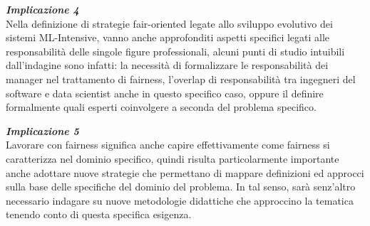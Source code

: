 	\begin{center}
	
        \begin{tcolorbox}[width=\textwidth, colframe=black, colback=Gray]
    			\begin{minipage}{\textwidth}
    				\textit{\faCaretSquareORight  \textbf{ Implicazione 4}}\\
    		   Nella definizione di strategie fair-oriented legate allo sviluppo evolutivo dei sistemi ML-Intensive, vanno anche approfonditi aspetti specifici legati alle responsabilità delle singole figure professionali, alcuni punti di studio intuibili dall'indagine sono infatti: la necessità di formalizzare le responsabilità dei manager nel trattamento di fairness, l'overlap di responsabilità tra ingegneri del software e data scientist anche in questo specifico caso, oppure il definire formalmente quali esperti coinvolgere a seconda del problema specifico.
    			\end{minipage}
		\end{tcolorbox}
	\end{center}
	
	\begin{center}
	
        \begin{tcolorbox}[width=\textwidth, colframe=black, colback=Gray]
    			\begin{minipage}{\textwidth}
    				\textit{\faCaretSquareORight  \textbf{ Implicazione 5}}\\
    		    Lavorare con fairness significa anche capire effettivamente come fairness si caratterizza nel dominio specifico, quindi risulta particolarmente importante anche adottare nuove strategie che permettano di mappare definizioni ed approcci sulla base delle specifiche del dominio del problema. In tal senso, sarà senz'altro necessario indagare su nuove metodologie didattiche che approccino la tematica tenendo conto di questa specifica esigenza.
    			\end{minipage}
		\end{tcolorbox}
	\end{center}
\newpage
